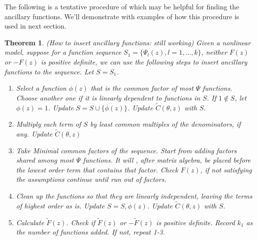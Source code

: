 \documentclass[11pt]{amsart}
\newtheorem{theorem}{Theorem}[section]
\theoremstyle{definition}
\theoremstyle{remark}
\begin{document}

The following is a tentative procedure of which may be helpful for finding the ancillary functions. We'll demonstrate with examples of how this procedure is used in next section.

\begin{theorem}\label{proc}(How to insert ancillary functions: still working)
Given a nonlinear model, suppose for a function sequence $S_1 = \{\Psi_l(z), l = 1,\ldots,k\}$, neither $F(z)$ or $-F(z)$ is positive definite, we can use the following steps to insert ancillary functions to the sequence. Let $S = S_1$.
\begin{enumerate}
    \item Select a function $\phi(z)$ that is the common factor of most $\Psi$ functions. Choose another one if it is linearly dependent to functions in $S$. If $1\not\in S$, let $\phi(z) = 1$. Update $S = S\cup\{\phi(z)\}$. Update $\tilde{C}(\theta,z)$ with $S$.
    \item Multiply each term of $S$ by least common multiples of the denominators, if any. Update $\tilde{C}(\theta,z)$ 
    \item Take Minimal common factors of the sequence. Start from adding factors shared among most $\Psi$ functions. It will , after matrix algebra, be placed before the lowest order term that contains that factor. Check $F(z)$, if not satisfying the assumptions continue until run out of factors.
    
    \item Clean up the functions so that they are linearly independent, leaving the terms of highest order as is. Update $S = {S,\phi(z)}$. Update $\tilde{C}(\theta,z)$ with $S$.
     \item Calculate $\tilde{F}(z)$. Check if $\tilde{F}(z)$ or $-\tilde{F}(z)$ is positive definite. Record $k_1$ as the number of functions added. If not, repeat 1-3.
\end{enumerate}
\end{theorem}
\end{document}
